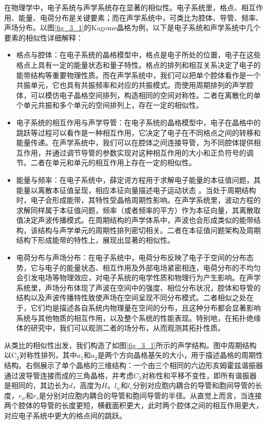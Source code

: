 在物理学中，电子系统与声学系统存在显著的相似性。电子系统里，格点、相互作用、能量、电荷分布是关键要素；而在声学系统中，可类比为腔体、导管、频率、声场分布。以图\ref{fig_3_1}的Kagome晶格为例，以下是电子系统和声学系统中几个要素的相似性详细解释：
\begin{itemize}
  \item 格点与腔体：在电子系统的晶格模型中，格点是电子所处的位置，电子在这些格点上具有一定的能量状态和量子特性。格点的排列和相互关系决定了电子的能带结构等重要物理性质。而在声学系统中，我们可以把单个腔体看作是一个共振单元，它也具有共振频率和对应的共振模式。而使用周期排列的声学腔体，可以模仿电子晶格空间排列，构造相同的空间对称性。二者在离散化的单个单元共振和多个单元的空间排列上，存在一定的相似性。
  \item 电子系统的相互作用与声学导管：在电子系统的晶格模型中，电子在晶格中的跳跃等过程可以看作是一种相互作用，它决定了电子在不同格点之间的转移和能量传递。在声学系统中，我们可以在腔体之间连接导管，为不同腔体提供相互作用，并通过调节导管的参数实现对这种相互作用的大小和正负符号的调节。二者在单元和单元的相互作用上存在一定的相似性。
  \item 能量与频率：在电子系统中，薛定谔方程用于求解电子能量的本征值问题，其能量以离散本征值呈现，相应本征向量描述电子运动状态 。当处于周期结构时，电子会形成能带，其特性受晶格周期性影响。在声学系统里，波动方程的求解同样属于本征值问题，频率（或者频率的平方）作为本征向量，其离散取值决定声波传播模式。在周期结构的声学体系中，声波也会形成类似的能带结构，该结构与声学单元的周期性排列密切相关。二者在本征值问题架构及周期结构下形成能带的特性上，展现出显著的相似性。 
  \item 电荷分布与声场分布：在电子系统中，电荷分布反映了电子于空间的分布态势，它与电子的能量状态、相互作用及外部电场紧密相连，电荷分布的不均匀会引发电场等物理效应，对电子系统的电学性质和物理行为产生影响。在声学系统里，声场分布体现了声波在空间中的强度、相位分布状况，腔体和导管的结构以及声波传播特性致使声场在空间呈现不同分布模式。二者相似之处在于，它们均是描述各自系统内物理量在空间的分布，且这种分布都会显著影响系统与其他物质的相互作用，以及整个系统的性能表现。特别地，在拓扑绝缘体的研究中，我们可以观测二者的场分布，从而观测其拓扑性质。 
\end{itemize}

从类比的相似性出发，我们构造了如图\ref{fig_3_1}所示的声学结构。图中周期结构以C$_{3}$对称性排列，其中$a_1$和$a_2$是两个方向晶格基矢的大小，用于描述晶格的周期性结构。右侧展示了单个晶格的三维结构：一个由三个相同的六边形亥姆霍兹谐振器通过波导管连接而成的三角晶格，并考虑$C_3$对称性和平移不变性，即所有谐振器是相同的，其边长为$d$，高度为$H$。$l_w$和$l_v$分别对应胞内耦合的导管和胞间导管的长度，$r_w$和$r_v$是分别对应胞内耦合的导管和胞间导管的半径。从直觉上而言，当连接两个腔体的导管的长度更短，横截面积更大，此时两个腔体之间的相互作用更大，对应电子系统中更大的格点间的跳跃。

